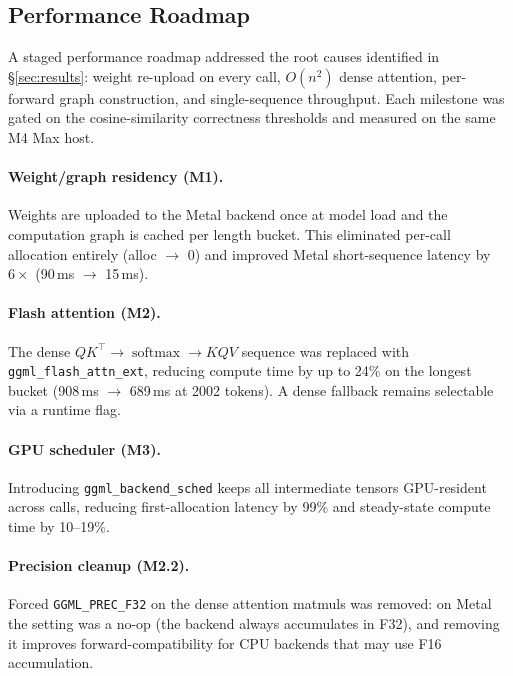 \documentclass{article}
\begin{document}
\subsection{Performance Roadmap}
\label{sec:perf-roadmap}

A staged performance roadmap addressed the root causes identified in \S\ref{sec:results}: weight re-upload on every call, $O(n^2)$ dense attention, per-forward graph construction, and single-sequence throughput. Each milestone was gated on the cosine-similarity correctness thresholds and measured on the same M4 Max host.

\paragraph{Weight/graph residency (M1).}
Weights are uploaded to the Metal backend once at model load and the computation graph is cached per length bucket. This eliminated per-call allocation entirely (alloc $\to$ 0) and improved Metal short-sequence latency by $6\times$ (90\,ms $\to$ 15\,ms).

\paragraph{Flash attention (M2).}
The dense $QK^\top \to \operatorname{softmax} \to KQV$ sequence was replaced with \texttt{ggml\_flash\_attn\_ext}, reducing compute time by up to 24\% on the longest bucket (908\,ms $\to$ 689\,ms at 2002 tokens). A dense fallback remains selectable via a runtime flag.

\paragraph{GPU scheduler (M3).}
Introducing \texttt{ggml\_backend\_sched} keeps all intermediate tensors GPU-resident across calls, reducing first-allocation latency by 99\% and steady-state compute time by 10--19\%.

\paragraph{Precision cleanup (M2.2).}
Forced \texttt{GGML\_PREC\_F32} on the dense attention matmuls was removed: on Metal the setting was a no-op (the backend always accumulates in F32), and removing it improves forward-compatibility for CPU backends that may use F16 accumulation.
\end{document}
